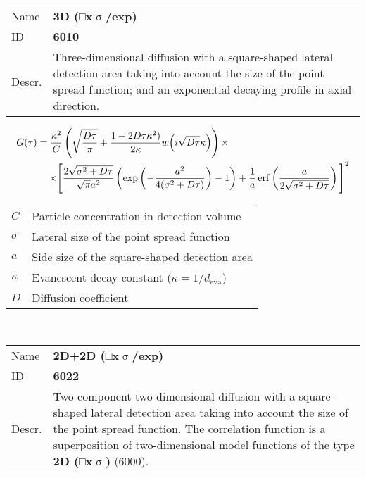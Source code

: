 \noindent \begin{tabular}{lp{}}
Name & \textbf{3D (□x$\upsigma$/exp)} \\ 
ID & \textbf{6010} \\ 
Descr. &  Three-dimensional diffusion with a square-shaped lateral detection area taking into account the size of the point spread function; and an exponential decaying profile in axial direction. \\ 
\end{tabular}
\begin{align}
G(\tau) =  \frac{\kappa^2}{C} &
\left( \sqrt{\frac{D \tau}{\pi}} + \frac{1 - 2 D \tau \kappa^2)}{2 \kappa} w\!\left(i \sqrt{D \tau} \kappa\right) \right) \times \\
\notag  \times \Bigg[ & \frac{2 \sqrt{\sigma^2+D \tau}}{\sqrt{\pi} a^2}
\left( \exp\left(-\frac{a^2}{4(\sigma^2+D \tau)}\right) - 1 \right) +
\frac{1}{a} \, \mathrm{erf}\left(\frac{a}{2 \sqrt{\sigma^2+D \tau}}\right) \Bigg]^2
\end{align} 
\begin{center}
\begin{tabular}{ll}
$C$ & Particle concentration in detection volume \\ 
$\sigma$ & Lateral size of the point spread function \\ 
$a$ & Side size of the square-shaped detection area \\
$\kappa$ &  Evanescent decay constant ($\kappa = 1/d_\mathrm{eva}$)\\ 
$D$ & Diffusion coefficient \\
\end{tabular} \\
\end{center}
\vspace{2em}


\noindent \begin{tabular}{lp{}}
Name & \textbf{2D+2D (□x$\upsigma$/exp)} \\ 
ID & \textbf{6022} \\ 
Descr. &  Two-component two-dimensional diffusion with a square-shaped lateral detection area taking into account the size of the point spread function. \newline
The correlation function is a superposition of two-dimensional model functions of the type \textbf{2D (□x$\upsigma$)} (6000). \\
\end{tabular}
\vspace{2em}


